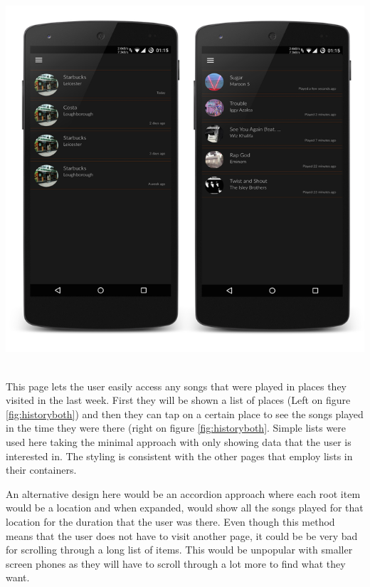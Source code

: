 \noindent
\begin{minipage}{\linewidth}
\centering
\includegraphics[scale=0.58]{./img/historyboth.png}
\label{fig:historyboth}
\end{minipage}\\

This page lets the user easily access any songs that were played in places they visited in the last week. First they will be shown a list of places (Left on figure \ref{fig:historyboth}) and then they can tap on a certain place to see the songs played in the time they were there (right on figure \ref{fig:historyboth}. Simple lists were used here taking the minimal approach with only showing data that the user is interested in. The styling is consistent with the other pages that employ lists in their containers.

An alternative design here would be an accordion approach where each root item would be a location and when expanded, would show all the songs played for that location for the duration that the user was there. Even though this method means that the user does not have to visit another page, it could be be very bad for scrolling through a long list of items. This would be unpopular with smaller screen phones as they will have to scroll through a lot more to find what they want.

\newpage

